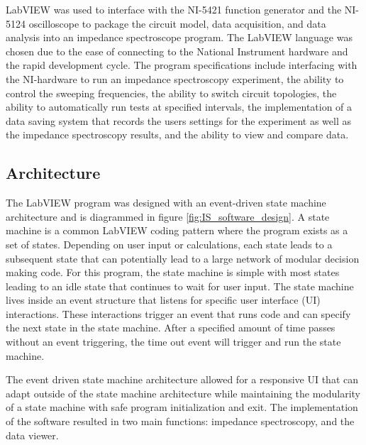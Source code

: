 \par LabVIEW was used to interface with the NI-5421 function generator and the NI-5124 oscilloscope to package the circuit model, data acquisition, and data analysis into an impedance spectroscope program. The LabVIEW language was chosen due to the ease of connecting to the National Instrument hardware and the rapid development cycle. The program specifications include interfacing with the NI-hardware to run an impedance spectroscopy experiment, the ability to control the sweeping frequencies, the ability to switch circuit topologies, the ability to automatically run tests at specified intervals, the implementation of a data saving system that records the users settings for the experiment as well as the impedance spectroscopy results, and the ability to view and compare data.



\subsection{Architecture}

\par The LabVIEW program was designed with an event-driven state machine architecture and is diagrammed in figure \ref{fig:IS_software_design}. A state machine is a common LabVIEW coding pattern where the program exists as a set of states. Depending on user input or calculations, each state leads to a subsequent state that can potentially lead to a large network of modular decision making code. For this program, the state machine is simple with most states leading to an idle state that continues to wait for user input. The state machine lives inside an event structure that listens for specific user interface (UI) interactions. These interactions trigger an event that runs code and can specify the next state in the state machine. After a specified amount of time passes without an event triggering, the time out event will trigger and run the state machine.    

\par The event driven state machine architecture allowed for a responsive UI that can adapt outside of the state machine architecture while maintaining the modularity of a state machine with safe program initialization and exit. The implementation of the software resulted in two main functions: impedance spectroscopy, and the data viewer.

